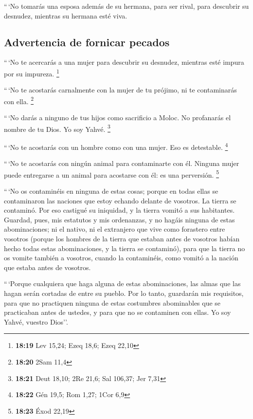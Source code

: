  ``\,`No tomarás una esposa además de su hermana, para
ser rival, para descubrir su desnudez, mientras su hermana esté viva.

\hypertarget{advertencia-de-fornicar-pecados}{%
\subsection{Advertencia de fornicar
pecados}\label{advertencia-de-fornicar-pecados}}

 ``\,`No te acercarás a una mujer para descubrir su
desnudez, mientras esté impura por su impureza. \footnote{\textbf{18:19}
  Lev 15,24; Ezeq 18,6; Ezeq 22,10}

 ``\,`No te acostarás carnalmente con la mujer de tu
prójimo, ni te contaminarás con ella. \footnote{\textbf{18:20} 2Sam 11,4}

 ``\,`No darás a ninguno de tus hijos como sacrificio a
Moloc. No profanarás el nombre de tu Dios. Yo soy Yahvé. \footnote{\textbf{18:21}
  Deut 18,10; 2Re 21,6; Sal 106,37; Jer 7,31}

 ``\,`No te acostarás con un hombre como con una mujer.
Eso es detestable. \footnote{\textbf{18:22} Gén 19,5; Rom 1,27; 1Cor 6,9}

 ``\,`No te acostarás con ningún animal para contaminarte
con él. Ninguna mujer puede entregarse a un animal para acostarse con
él: es una perversión. \footnote{\textbf{18:23} Éxod 22,19}

 ``\,`No os contaminéis en ninguna de estas cosas; porque
en todas ellas se contaminaron las naciones que estoy echando delante de
vosotros.  La tierra se contaminó. Por eso castigué su
iniquidad, y la tierra vomitó a sus habitantes.  Guardad,
pues, mis estatutos y mis ordenanzas, y no hagáis ninguna de estas
abominaciones; ni el nativo, ni el extranjero que vive como forastero
entre vosotros  (porque los hombres de la tierra que
estaban antes de vosotros habían hecho todas estas abominaciones, y la
tierra se contaminó),  para que la tierra no os vomite
también a vosotros, cuando la contaminéis, como vomitó a la nación que
estaba antes de vosotros.

 ``\,`Porque cualquiera que haga alguna de estas
abominaciones, las almas que las hagan serán cortadas de entre su
pueblo.  Por lo tanto, guardarán mis requisitos, para que
no practiquen ninguna de estas costumbres abominables que se practicaban
antes de ustedes, y para que no se contaminen con ellas. Yo soy Yahvé,
vuestro Dios''.

